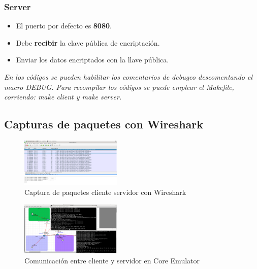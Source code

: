 \documentclass[letterpaper, 10 pt, conference]{ieeeconf}  %
\begin{document}
\subsubsection{Server}
\begin{itemize}
	\item El puerto por defecto es \textbf{8080}.
	\item Debe \textbf{recibir} la clave pública de encriptación.
	\item Enviar los datos encriptados con la llave pública.
\end{itemize}

\textit{En los códigos se pueden habilitar los comentarios de debugeo descomentando el macro DEBUG. Para recompilar los códigos se puede emplear el Makefile, corriendo: make client y make server.}

\subsection{Capturas de paquetes con Wireshark}

\begin{figure}[H]
	\centering
	\includegraphics[width=0.43\textwidth]{./Imagenes/wireshark_1.png}
	\caption{Captura de paquetes cliente servidor con Wireshark}
\end{figure}

\begin{figure}[H]
	\centering
	\includegraphics[width=0.43\textwidth]{./Imagenes/captura_tcp_en_core.png}
	\caption{Comunicación entre cliente y servidor en Core Emulator}
\end{figure}
\end{document}

